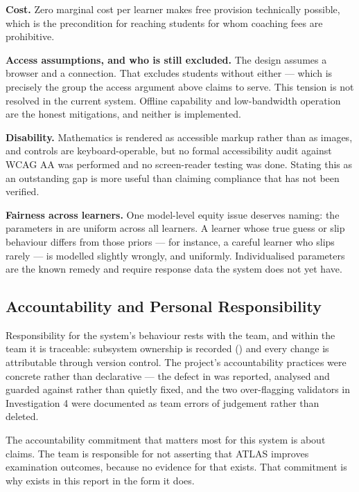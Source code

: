 \textbf{Cost.} Zero marginal cost per learner makes free provision technically
possible, which is the precondition for reaching students for whom coaching fees
are prohibitive.

\textbf{Access assumptions, and who is still excluded.} The design assumes a
browser and a connection. That excludes students without either --- which is
precisely the group the access argument above claims to serve. This tension is
not resolved in the current system. Offline capability and low-bandwidth
operation are the honest mitigations, and neither is implemented.

\textbf{Disability.} Mathematics is rendered as accessible markup rather than as
images, and controls are keyboard-operable, but no formal accessibility audit
against WCAG AA \cite{wcag21} was performed and no screen-reader testing was
done. Stating this as an outstanding gap is more useful than claiming compliance
that has not been verified.

\textbf{Fairness across learners.} One model-level equity issue deserves naming:
the parameters in  are uniform across all learners. A
learner whose true guess or slip behaviour differs from those priors --- for
instance, a careful learner who slips rarely --- is modelled slightly wrongly, and
uniformly. Individualised parameters \cite{yudelson2013individualized} are the
known remedy and require response data the system does not yet have.

\subsection{Accountability and Personal Responsibility}
\label{sec:accountability}

Responsibility for the system's behaviour rests with the team, and within the
team it is traceable: subsystem ownership is recorded
() and every change is attributable through version
control. The project's accountability practices were concrete rather than
declarative --- the defect in  was reported, analysed and
guarded against rather than quietly fixed, and the two over-flagging validators
in Investigation 4 were documented as team errors of judgement rather than
deleted.

The accountability commitment that matters most for this system is about claims.
The team is responsible for not asserting that ATLAS improves examination
outcomes, because no evidence for that exists. That commitment is why
 exists in this report in the form it does.

